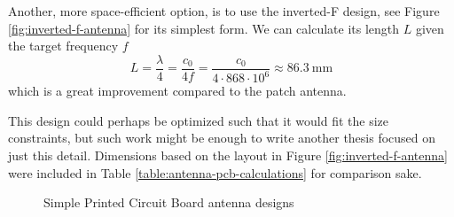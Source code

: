 Another, more space-efficient option, is to use the inverted-F design, see Figure \ref{fig:inverted-f-antenna} for its simplest form. We can calculate its length $L$ given the target frequency $f$
\begin{equation}
    L = \dfrac{\lambda}{4} = \dfrac{c_0}{4f} = \dfrac{c_0}{4 \cdot 868 \cdot 10^6} \approx 86.3~\mathrm{mm}
\end{equation}
which is a great improvement compared to the patch antenna.

This design could perhaps be optimized such that it would fit the size constraints, but such work might be enough to write another thesis focused on just this detail. Dimensions based on the layout in Figure \ref{fig:inverted-f-antenna} were included in Table \ref{table:antenna-pcb-calculations} for comparison sake.

\begin{figure}
    \centering
    \hfill
    \caption{Simple Printed Circuit Board antenna designs}
\end{figure}

